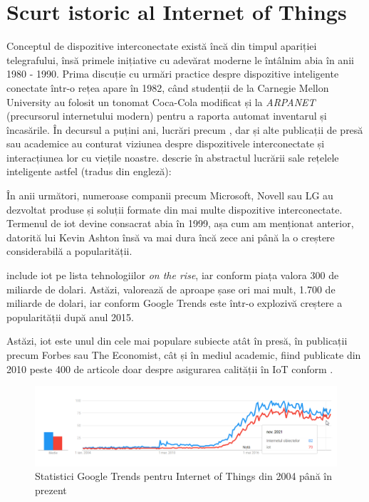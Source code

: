 \section{Scurt istoric al Internet of Things}

Conceptul de dispozitive interconectate există încă din timpul apariției telegrafului, însă primele inițiative cu adevărat moderne le întâlnim abia în anii 1980 - 1990. Prima discuție cu urmări practice despre dispozitive inteligente conectate într-o rețea apare în 1982, când studenții de la  Carnegie Mellon University au folosit un tonomat Coca-Cola modificat și  la \textit{ARPANET} (precursorul internetului modern) pentru a raporta automat inventarul și încasările. În decursul a puțini ani, lucrări precum \citet{Weiser1999}, dar și alte publicații de presă sau academice au conturat viziunea despre dispozitivele interconectate și interacțiunea lor cu viețile noastre. \citet{Raji1994} descrie în abstractul lucrării sale rețelele inteligente astfel (tradus din engleză):



În anii următori, numeroase companii precum Microsoft, Novell sau LG au dezvoltat produse și soluții formate din mai multe dispozitive interconectate. Termenul de \acrlong{iot} devine consacrat abia în 1999, așa cum am menționat anterior, datorită lui Kevin Ashton însă va mai dura încă zece ani până la o creștere considerabilă a popularității.

\citet{Gartner2011} include \acrlong{iot} pe lista tehnologiilor \textit{on the rise}, iar conform \citet{statistaIot} piața valora 300 de miliarde de dolari. Astăzi, valorează de aproape șase ori mai mult, 1.700 de miliarde de dolari, iar conform Google Trends este într-o explozivă creștere a popularității după anul 2015.

Astăzi, \acrlong{iot} este unul din cele mai populare subiecte atât în presă, în publicații precum Forbes sau The Economist, cât și în mediul academic, fiind publicate din 2010 peste 400 de articole doar despre asigurarea calității în IoT conform \citet{Ahmed2019}.

\begin{figure}[h]
\caption{Statistici Google Trends pentru Internet of Things din 2004 până în prezent}
\centering
\includegraphics[width=\textwidth]{images/trends_iot.png}
\end{figure}


